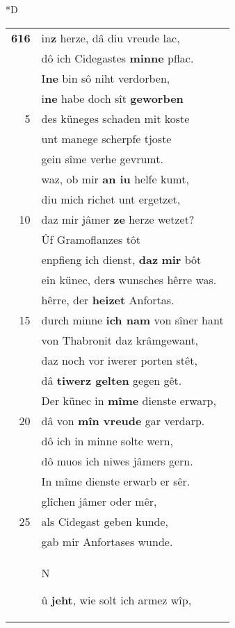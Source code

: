 \documentclass[8pt,a4paper,notitlepage]{article}
\begin{document}
\begin{table}[ht]
\begin{minipage}[t]{0.5\linewidth}
\small
\begin{center}*D
\end{center}
\begin{tabular}{rl}
\textbf{616} & in\textbf{z} herze, dâ diu vreude lac,\\ 
 & dô ich Cidegastes \textbf{minne} pflac.\\ 
 & I\textbf{ne} bin sô niht verdorben,\\ 
 & i\textbf{ne} habe doch sît \textbf{geworben}\\ 
5 & des küneges schaden mit koste\\ 
 & unt manege scherpfe tjoste\\ 
 & gein sîme verhe gevrumt.\\ 
 & waz, ob mir \textbf{an iu} helfe kumt,\\ 
 & diu mich richet unt ergetzet,\\ 
10 & daz mir jâmer \textbf{ze} herze wetzet?\\ 
 & Ûf Gramoflanzes tôt\\ 
 & enpfieng ich dienst, \textbf{daz} \textbf{mir} bôt\\ 
 & ein künec, der\textbf{s} wunsches hêrre was.\\ 
 & hêrre, der \textbf{heizet} Anfortas.\\ 
15 & durch minne \textbf{ich nam} von sîner hant\\ 
 & von Thabronit daz krâmgewant,\\ 
 & daz noch vor iwerer porten stêt,\\ 
 & dâ \textbf{tiwerz gelten} gegen gêt.\\ 
 & Der künec in \textbf{mîme} dienste erwarp,\\ 
20 & dâ von \textbf{mîn vreude} gar verdarp.\\ 
 & dô ich in minne solte wern,\\ 
 & dô muos ich niwes jâmers gern.\\ 
 & In mîme dienste erwarb er sêr.\\ 
 & glîchen jâmer oder mêr,\\ 
25 & als Cidegast geben kunde,\\ 
 & gab mir Anfortases wunde.\\ 
 & \begin{large}N\end{large}û \textbf{jeht}, wie solt ich armez wîp,\\ 

\end{tabular}
\end{minipage}
\end{table}
\end{document}
